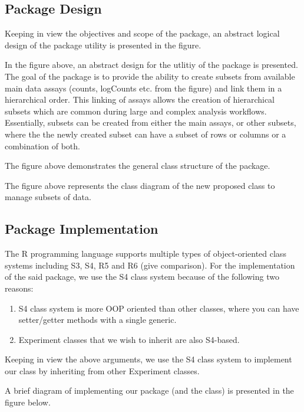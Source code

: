 \documentclass[
]{article}
\providecommand{\tightlist}{%
  \setlength{\itemsep}{0pt}\setlength{\parskip}{0pt}}
\begin{document}
\hypertarget{package-design}{%
\subsection{Package Design}\label{package-design}}

Keeping in view the objectives and scope of the package, an abstract
logical design of the package utility is presented in the figure.

In the figure above, an abstract design for the utlitiy of the package
is presented. The goal of the package is to provide the ability to
create subsets from available main data assays (counts, logCounts etc.
from the figure) and link them in a hierarchical order. This linking of
assays allows the creation of hierarchical subsets which are common
during large and complex analysis workflows. Essentially, subsets can be
created from either the main assays, or other subsets, where the the
newly created subset can have a subset of rows or columns or a
combination of both.

The figure above demonstrates the general class structure of the
package.

The figure above represents the class diagram of the new proposed class
to manage subsets of data.

\hypertarget{package-implementation}{%
\subsection{Package Implementation}\label{package-implementation}}

The R programming language supports multiple types of object-oriented
class systems including S3, S4, R5 and R6 (give comparison). For the
implementation of the said package, we use the S4 class system because
of the following two reasons:

\begin{enumerate}
\def\labelenumi{\arabic{enumi}.}
\tightlist
\item
  S4 class system is more OOP oriented than other classes, where you can
  have setter/getter methods with a single generic.
\item
  Experiment classes that we wish to inherit are also S4-based.
\end{enumerate}

Keeping in view the above arguments, we use the S4 class system to
implement our class by inheriting from other Experiment classes.

A brief diagram of implementing our package (and the class) is presented
in the figure below.
\end{document}
